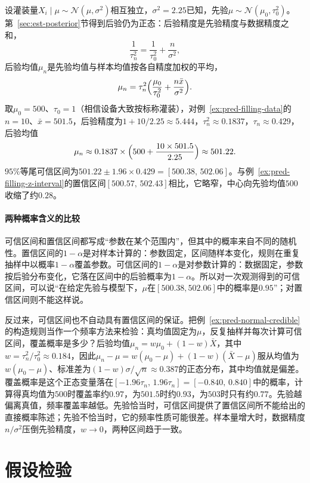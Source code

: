 \begin{example}[灌装量均值的可信区间]
\label{ex:pred-normal-credible}
设灌装量$X_i\mid\mu\sim\mathcal N(\mu,\sigma^2)$相互独立，$\sigma^2=2.25$已知，先验$\mu\sim\mathcal N(\mu_0,\tau_0^2)$。第~\ref{sec:est-posterior}节得到后验仍为正态：后验精度是先验精度与数据精度之和，
\[
 \frac1{\tau_n^2}=\frac1{\tau_0^2}+\frac n{\sigma^2},
\]
后验均值$\mu_n$是先验均值与样本均值按各自精度加权的平均，
\[
 \mu_n=\tau_n^2\Bigl(\frac{\mu_0}{\tau_0^2}+\frac{n\bar x}{\sigma^2}\Bigr).
\]
取$\mu_0=500$、$\tau_0=1$（相信设备大致按标称灌装），对例~\ref{ex:pred-filling-data}的$n=10$、$\bar x=501.5$，后验精度为$1+10/2.25\approx5.444$，$\tau_n^2\approx0.1837$，$\tau_n\approx0.429$，后验均值
\[
 \mu_n\approx0.1837\times\Bigl(500+\frac{10\times501.5}{2.25}\Bigr)\approx501.22.
\]
$95\%$等尾可信区间为$501.22\pm1.96\times0.429=[500.38,\,502.06]$。与例~\ref{ex:pred-filling-z-interval}的置信区间$[500.57,\,502.43]$相比，它略窄，中心向先验均值$500$收缩了约$0.28$。
\end{example}

\paragraph{两种概率含义的比较}

可信区间和置信区间都写成“参数在某个范围内”，但其中的概率来自不同的随机性。置信区间的$1-\alpha$是对样本计算的：参数固定，区间随样本变化，规则在重复抽样中以概率$1-\alpha$覆盖参数。可信区间的$1-\alpha$是对参数计算的：数据固定，参数按后验分布变化，它落在区间中的后验概率为$1-\alpha$。所以对一次观测得到的可信区间，可以说“在给定先验与模型下，$\mu$在$[500.38,502.06]$中的概率是$0.95$”；对置信区间则不能这样说。

反过来，可信区间也不自动具有置信区间的保证。把例~\ref{ex:pred-normal-credible}的构造规则当作一个频率方法来检验：真均值固定为$\mu$，反复抽样并每次计算可信区间，覆盖概率是多少？后验均值$\mu_n=w\mu_0+(1-w)\bar X$，其中$w=\tau_n^2/\tau_0^2\approx0.184$，因此$\mu_n-\mu=w(\mu_0-\mu)+(1-w)(\bar X-\mu)$服从均值为$w(\mu_0-\mu)$、标准差为$(1-w)\sigma/\sqrt n\approx0.387$的正态分布，其中均值就是偏差。覆盖概率是这个正态变量落在$[-1.96\tau_n,\,1.96\tau_n]=[-0.840,\,0.840]$中的概率，计算得真均值为$500$时覆盖率约$0.97$，为$501.5$时约$0.93$，为$503$时只有约$0.77$。先验越偏离真值，频率覆盖率越低。先验恰当时，可信区间提供了置信区间所不能给出的直接概率陈述；先验不恰当时，它的频率性质可能很差。样本量增大时，数据精度$n/\sigma^2$压倒先验精度，$w\to0$，两种区间趋于一致。

\section{假设检验}
\label{sec:pred-tests}

